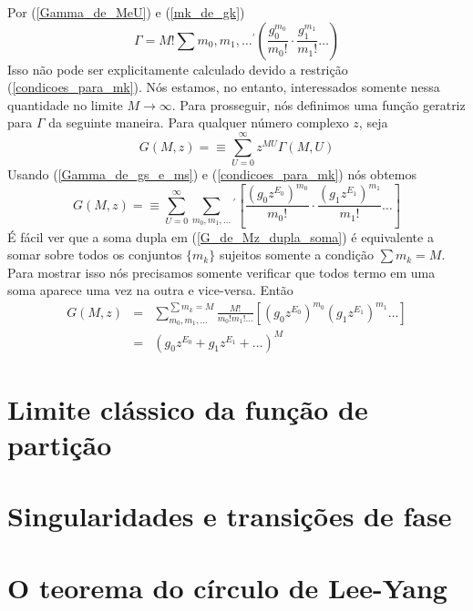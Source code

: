 Por (\ref{Gamma_de_MeU}) e (\ref{mk_de_gk})
\begin{equation}
\Gamma=M! \sum{m_{0},m_{1}, \dots} {}^{'} \left(\frac{g_{0}^{m_{0}}}{m_{0}!}\cdot \frac{g_{1}^{m_{1}}}{m_{1}!}\dots \right)
\label{Gamma_de_gs_e_ms}
\end{equation}
Isso não pode ser explicitamente calculado devido a restrição (\ref{condicoes_para_mk}). Nós estamos, no entanto, interessados somente nessa quantidade no limite $M\rightarrow \infty$. Para prosseguir, nós definimos uma função geratriz para $\Gamma$ da seguinte maneira. Para qualquer número complexo $z$, seja
\begin{equation}
G(M,z)=\equiv \sum_{U=0}^{\infty}z^{MU}\Gamma(M,U)
\end{equation}
Usando (\ref{Gamma_de_gs_e_ms}) e (\ref{condicoes_para_mk}) nós obtemos
\begin{equation}
G(M,z)=\equiv \sum_{U=0}^{\infty} \sum_{m_{0},m_{1}, \dots} {}^{'} \left[\frac{(g_{0}z^{E_{0}})^{m_{0}}}{m_{0}!}\cdot \frac{(g_{1}z^{E_{1}})^{m_{1}}}{m_{1}!}\dots \right]
\label{G_de_Mz_dupla_soma}
\end{equation}
É fácil ver que a soma dupla em (\ref{G_de_Mz_dupla_soma}) é equivalente a somar sobre todos os conjuntos $\{m_{k}\}$ sujeitos somente a condição $\sum m_{k}=M$. Para mostrar isso nós precisamos somente verificar que todos termo em uma soma aparece uma vez na outra e vice-versa. Então
\begin{eqnarray}
G(M,z)&=& \sum_{m_{0},m_{1}, \dots}^{\sum m_{k}=M} \frac{M!}{m_{0}!m_{1}!\dots} \left[ (g_{0}z^{E_{0}})^{m_{0}} (g_{1}z^{E_{1}})^{m_{1}} \dots \right]
\nonumber \\
&=&(g_{0}z^{E_{0}}+g_{1}z^{E_{1}}+\dots)^{M}
\end{eqnarray}



\section{Limite clássico da função de partição}
\noindent

\section{Singularidades e transições de fase}
\noindent

\section{O teorema do círculo de Lee-Yang}
\noindent

